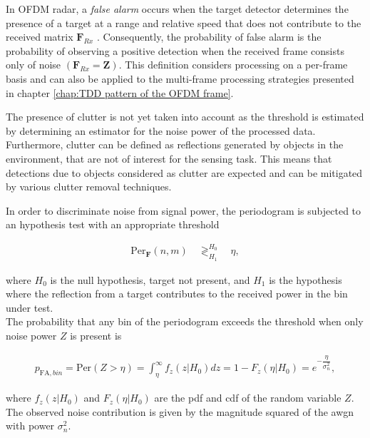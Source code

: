 				
				In OFDM radar, a \textit{false alarm} occurs when the target detector determines the presence of a target at a range and relative speed that does not contribute to the received matrix $\mathbf F_{Rx}$ \cite{Braun2014OFDMRA}. 
				Consequently, the probability of false alarm is the probability of observing a positive detection when the received frame consists only of noise $(\mathbf F_{Rx} = \mathbf Z)$. 
				This definition considers processing on a per-frame basis and can also be applied to the multi-frame processing strategies presented in chapter \ref{chap:TDD pattern of the OFDM frame}. 
				
				The presence of clutter is not yet taken into account as the threshold is estimated by determining an estimator for the noise power of the processed data. 
				Furthermore, clutter can be defined as reflections generated by objects in the environment, that are not of interest for the sensing task. 
				This means that detections due to objects considered as clutter are expected and can be mitigated by various clutter removal techniques.
				
				In order to discriminate noise from signal power, the periodogram is subjected to an hypothesis test with an appropriate threshold
				
				\begin{align*}
					\text{Per}_{\mathbf F}(n,m) \quad\mathop{\gtrless}_{H_1}^{H_0}  \quad \eta,
				\end{align*}
				
				where $H_0$ is the null hypothesis, target not present, and $H_1$ is the hypothesis where the reflection from a target contributes to the received power in the bin under test.\\
				The probability that any bin of the periodogram exceeds the threshold when only noise power $Z$ is present is
				
				\begin{align*}
					p_{\text{FA},bin} = \text{Per}(Z > \eta) = \int_\eta^{\infty} f_z(z|H_0)dz = 1 - F_z(\eta | H_0) = e^{-\dfrac{\eta}{\sigma_n^2}},
				\end{align*}
				 
				where $f_z(z|H_0)$ and $F_z(\eta | H_0)$ are the \gls{pdf} and \gls{cdf} of the random variable $Z$. 
				The observed noise contribution is given by the magnitude squared of the \gls{awgn} with power $\sigma_n^2$.
				 
